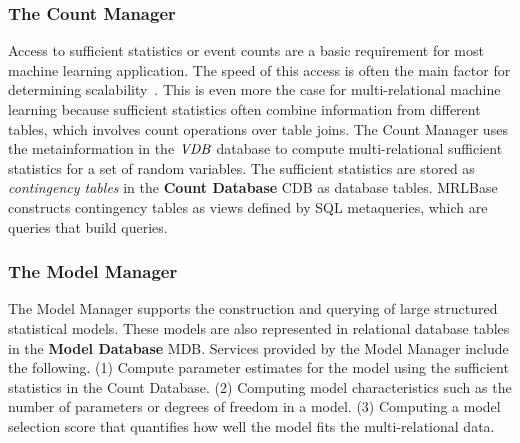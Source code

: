\documentclass{acm_proc_article-sp}
\begin{document}
\subsubsection{The Count Manager}
Access to sufficient statistics or event counts are a basic requirement for most machine learning application. The speed of this access is often the main factor for determining scalability~\cite{Russell2010,Moore1998}. This is even more the case for multi-relational machine learning because sufficient statistics often combine information from different tables, which involves count operations over table joins. The Count Manager uses the metainformation in the $\it{VDB}$ database to compute multi-relational sufficient statistics for a set of random variables.  The sufficient statistics are stored as {\em contingency tables} in the \textbf{Count Database} CDB as database tables. MRLBase constructs contingency tables as views defined by SQL metaqueries, which are queries that build queries.
%
%


\subsubsection{The Model Manager} 

The Model Manager supports the construction and querying of large structured statistical models. These models are also represented in relational database tables in the \textbf{Model Database} MDB. Services provided by the Model Manager include the following. (1) Compute parameter estimates for the model using the sufficient statistics in the Count Database.  (2) Computing model characteristics such as the number of parameters or degrees of freedom in a model. (3) Computing a model selection score that quantifies how well the model fits the multi-relational data. 
\end{document}
